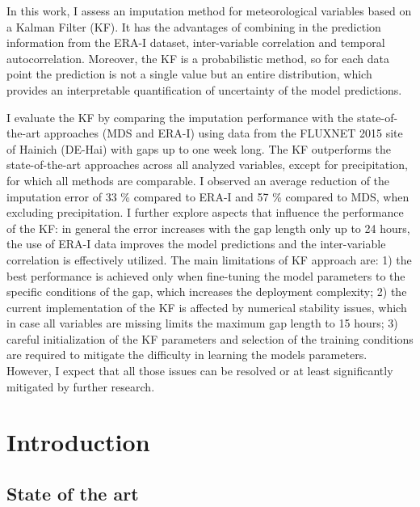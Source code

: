 \documentclass{article}
\let\Oldsection\section
\renewcommand{\section}{\FloatBarrier\Oldsection}
\let\Oldsubsection\subsection
\renewcommand{\subsection}{\FloatBarrier\Oldsubsection}
\begin{document}
In this work, I assess an imputation method for meteorological variables based on a Kalman Filter (KF).
It has the advantages of combining in the prediction information from the ERA-I dataset, inter-variable correlation and  temporal autocorrelation. Moreover, the KF is a probabilistic method, so for each data point the prediction is not a single value but an entire distribution, which provides an interpretable quantification of uncertainty of the model predictions.

I evaluate the KF by  comparing the imputation performance with the state-of-the-art approaches (MDS and ERA-I) using data from the FLUXNET 2015 site of Hainich (DE-Hai) with gaps up to one week long. The KF outperforms the state-of-the-art approaches across all analyzed variables, except for precipitation, for which all methods are comparable. I observed an average reduction of the imputation error of 33 \% compared to ERA-I and  57 \% compared to MDS, when excluding precipitation. I further explore aspects that influence the performance of the KF: in general the error increases with the gap length only up to 24 hours, the use of ERA-I data improves the model predictions and the inter-variable correlation is effectively utilized.
The main limitations of KF approach are: 1) the best performance is achieved only when fine-tuning the model parameters to the specific conditions of the gap, which increases the deployment complexity; 2) the current implementation of the KF is affected by numerical stability issues, which in case all variables are missing limits the maximum gap length to 15 hours; 3) careful initialization of the KF parameters and selection of the training conditions are required to mitigate the difficulty in learning the models parameters. However, I expect that all those issues can be resolved or at least significantly mitigated by further research.
\thispagestyle{empty}
\clearpage

\setcounter{tocdepth}{2}
\tableofcontents
\thispagestyle{empty}
\clearpage

\section{Introduction}

\subsection{State of the art}
\end{document}
